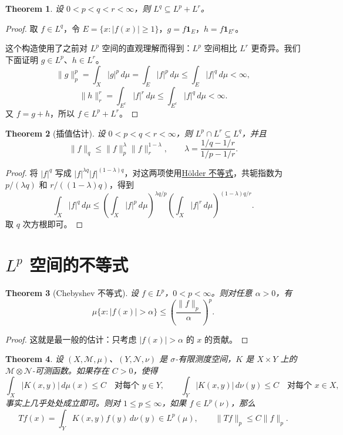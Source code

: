 \documentclass[12pt,letterpaper,twoside,openright]{ctexbook}
\theoremstyle{bluehead}
\newtheorem{theorem}{Theorem}
\theoremstyle{olivehead}
\theoremstyle{orangehead}
\theoremstyle{redremark}
\begin{document}
\begin{theorem}
设 $0<p<q<r<\infty$，则 $L^q\subseteq L^p+L^r$。
\end{theorem}
\begin{proof}
取 $f\in L^q$，令 $E=\{x:|f(x)|\geq1\}$，$g=f\mathbf1_E$，$h=f\mathbf1_{E^c}$。

这个构造使用了之前对 $L^p$ 空间的直观理解而得到：$L^p$ 空间相比 $L^r$ 更奇异。我们下面证明 $g\in L^p$、$h\in L^r$。
\[
\|g\|_p^p=\int_X|g|^p\,d\mu
=\int_E|f|^p\,d\mu
\leq\int_E|f|^q\,d\mu<\infty,
\]
\[
\|h\|_r^r=\int_{E^c}|f|^r\,d\mu
\leq\int_{E^c}|f|^q\,d\mu<\infty.
\]
又 $f=g+h$，所以 $f\in L^p+L^r$。
\end{proof}
\begin{theorem}[插值估计]
设 $0<p<q<r<\infty$，则 $L^p\cap L^r\subseteq L^q$，并且
\[
\|f\|_q\leq\|f\|_p^\lambda\|f\|_r^{1-\lambda},
\qquad
\lambda=\frac{1/q-1/r}{1/p-1/r}.
\]
\end{theorem}
\begin{proof}
将 $|f|^q$ 写成 $|f|^{\lambda q}|f|^{(1-\lambda)q}$，对这两项使用\hyperref[thm:holder-lp]{Hölder 不等式}，共轭指数为 $p/(\lambda q)$ 和 $r/((1-\lambda)q)$，得到
\[
\int_X|f|^q\,d\mu
\leq\left(\int_X|f|^p\,d\mu\right)^{\lambda q/p}
\left(\int_X|f|^r\,d\mu\right)^{(1-\lambda)q/r}.
\]
取 $q$ 次方根即可。
\end{proof}
\section{\texorpdfstring{$L^p$}{Lp} 空间的不等式}
\begin{theorem}[Chebyshev 不等式]
设 $f\in L^p$，$0<p<\infty$。则对任意 $\alpha>0$，有
\[
\mu\{x:|f(x)|>\alpha\}
\leq\left(\frac{\|f\|_p}{\alpha}\right)^p.
\]
\end{theorem}
\begin{proof}
这就是最一般的估计：只考虑 $|f(x)|>\alpha$ 的 $x$ 的贡献。
\end{proof}

\begin{theorem}
设 $(X,\mathcal M,\mu)$、$(Y,\mathcal N,\nu)$ 是 $\sigma$-有限测度空间，$K$ 是 $X\times Y$ 上的 $\mathcal M\otimes\mathcal N$-可测函数。如果存在 $C>0$，使得
\[
\int_X|K(x,y)|\,d\mu(x)\leq C\quad\text{对每个 }y\in Y,
\qquad
\int_Y|K(x,y)|\,d\nu(y)\leq C\quad\text{对每个 }x\in X,
\]
事实上几乎处处成立即可。则对 $1\leq p\leq\infty$，如果 $f\in L^p(\nu)$，那么
\[
Tf(x)=\int_YK(x,y)f(y)\,d\nu(y)\in L^p(\mu),
\qquad
\|Tf\|_p\leq C\|f\|_p.
\]
\end{theorem}
\end{document}
